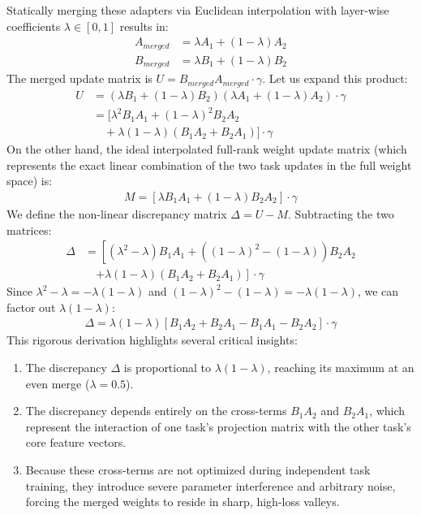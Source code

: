 \documentclass{article}
\begin{document}
Statically merging these adapters via Euclidean interpolation with layer-wise coefficients $\lambda \in [0, 1]$ results in:
\begin{align}
A_{merged} &= \lambda A_1 + (1 - \lambda) A_2 \\
B_{merged} &= \lambda B_1 + (1 - \lambda) B_2
\end{align}
The merged update matrix is $U = B_{merged} A_{merged} \cdot \gamma$. Let us expand this product:
\begin{align}
U &= (\lambda B_1 + (1 - \lambda) B_2)(\lambda A_1 + (1 - \lambda) A_2) \cdot \gamma \nonumber \\
  &= \Big[ \lambda^2 B_1 A_1 + (1 - \lambda)^2 B_2 A_2 \nonumber \\
  &\quad + \lambda(1 - \lambda) (B_1 A_2 + B_2 A_1) \Big] \cdot \gamma
\end{align}
On the other hand, the ideal interpolated full-rank weight update matrix (which represents the exact linear combination of the two task updates in the full weight space) is:
\begin{align}
M = \left[ \lambda B_1 A_1 + (1 - \lambda) B_2 A_2 \right] \cdot \gamma
\end{align}
We define the non-linear discrepancy matrix $\Delta = U - M$. Subtracting the two matrices:
\begin{align}
\Delta &= \left[ (\lambda^2 - \lambda) B_1 A_1 + ((1-\lambda)^2 - (1-\lambda)) B_2 A_2 \right. \nonumber \\
       &\quad \left. + \lambda(1-\lambda) (B_1 A_2 + B_2 A_1) \right] \cdot \gamma
\end{align}
Since $\lambda^2 - \lambda = -\lambda(1-\lambda)$ and $(1-\lambda)^2 - (1-\lambda) = -\lambda(1-\lambda)$, we can factor out $\lambda(1-\lambda)$:
\begin{align}
\Delta = \lambda(1 - \lambda) \left[ B_1 A_2 + B_2 A_1 - B_1 A_1 - B_2 A_2 \right] \cdot \gamma
\end{align}
This rigorous derivation highlights several critical insights:
\begin{enumerate}
    \item The discrepancy $\Delta$ is proportional to $\lambda(1-\lambda)$, reaching its maximum at an even merge ($\lambda = 0.5$).
    \item The discrepancy depends entirely on the cross-terms $B_1 A_2$ and $B_2 A_1$, which represent the interaction of one task's projection matrix with the other task's core feature vectors.
    \item Because these cross-terms are not optimized during independent task training, they introduce severe parameter interference and arbitrary noise, forcing the merged weights to reside in sharp, high-loss valleys.
\end{enumerate}
\end{document}
